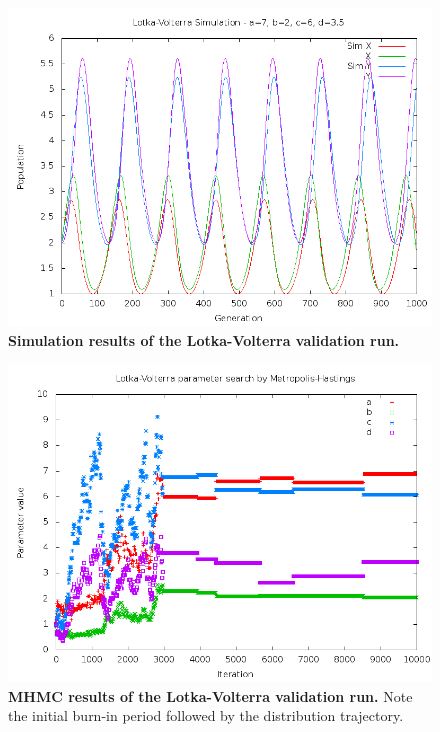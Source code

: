 \begin{figure}
 \centering
 \includegraphics[width=14cm]{./03-parameterestimationmethodologies/data/Simulation.png}
 \caption[{Simulation results of the Lotka-Volterra validation run.}]{{\bf Simulation results of the Lotka-Volterra validation run.}
 \label{fig:simulation}}

\end{figure}

\begin{figure}
 \centering
 \includegraphics[width=14cm]{./03-parameterestimationmethodologies/data/Parameters.png}
 \caption[{MHMC results of the Lotka-Volterra validation run.}]{{\bf MHMC results of the Lotka-Volterra validation run.} Note the initial burn-in period followed by the distribution trajectory.
 \label{fig:parameters}}
\end{figure}


